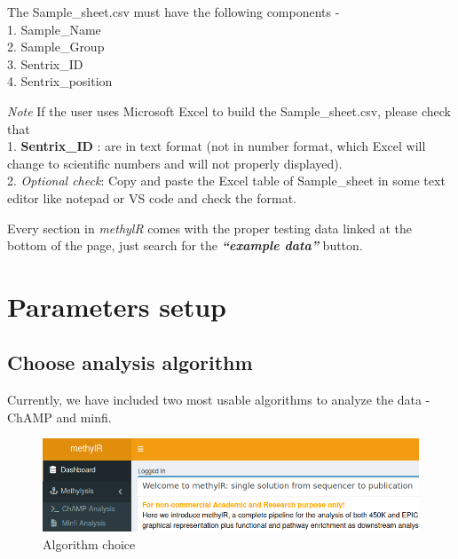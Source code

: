 \documentclass[
  a4paper,
  oneside,
  open=any]{scrreport}
\begin{document}
The Sample\_sheet.csv must have the following components -\\
1. Sample\_Name\\
2. Sample\_Group\\
3. Sentrix\_ID\\
4. Sentrix\_position

\begin{tcolorbox}[enhanced jigsaw, left=2mm, colback=white, breakable, leftrule=.75mm, coltitle=black, toprule=.15mm, rightrule=.15mm, colbacktitle=quarto-callout-warning-color!10!white, title=\textcolor{quarto-callout-warning-color}{\faExclamationTriangle}\hspace{0.5em}{Warning}, opacitybacktitle=0.6, colframe=quarto-callout-warning-color-frame, bottomrule=.15mm, bottomtitle=1mm, toptitle=1mm, titlerule=0mm, opacityback=0, arc=.35mm]
\emph{Note} If the user uses Microsoft Excel to build the
Sample\_sheet.csv, please check that\\
1. \textbf{Sentrix\_ID} : are in text format (not in number format,
which Excel will change to scientific numbers and will not properly
displayed).\\
2. \emph{Optional check}: Copy and paste the Excel table of
Sample\_sheet in some text editor like notepad or VS code and check the
format.
\end{tcolorbox}

Every section in \emph{methylR} comes with the proper testing data
linked at the bottom of the page, just search for the
\textbf{\emph{``example data''}} button.

\hypertarget{parameters-setup}{%
\section{Parameters setup}\label{parameters-setup}}

\hypertarget{choose-analysis-algorithm}{%
\subsection{Choose analysis algorithm}\label{choose-analysis-algorithm}}

Currently, we have included two most usable algorithms to analyze the
data - ChAMP and minfi.\\

\begin{figure}[H]

{\centering \includegraphics{./_images/methylysis_01.png}

}

\caption{Algorithm choice}

\end{figure}
\end{document}
